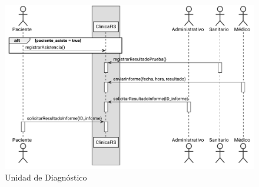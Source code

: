 \documentclass[11pt,a4paper]{article}
\begin{document}
\begin{figure}[H]
	\caption{Unidad de Diagnóstico}
	\centering
	\includegraphics[width=\textwidth,height=\textheight,keepaspectratio]{diagramas/pdf/diagramaUnidadDiagnostico.pdf}
\end{figure}
\end{document}
